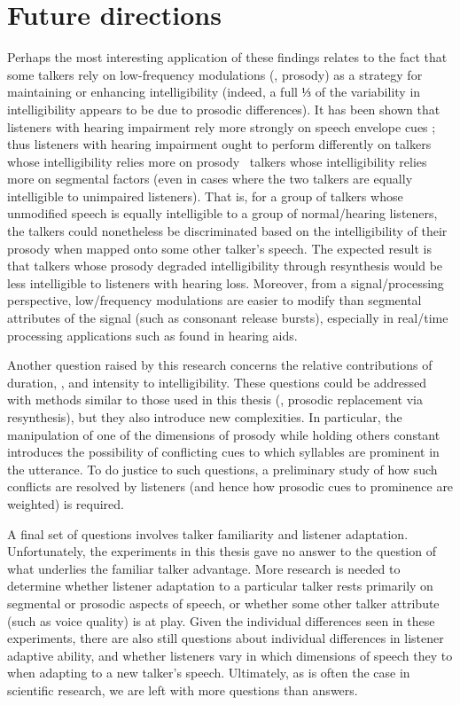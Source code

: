 \section{Future directions}
Perhaps the most interesting application of these findings relates to the fact that some talkers rely on low-frequency modulations (\ie, prosody) as a strategy for maintaining or enhancing intelligibility (indeed, a full ⅓ of the variability in intelligibility appears to be due to prosodic differences).  It has been shown that listeners with hearing impairment rely more strongly on speech envelope cues \citep{LorenziEtAl2006}; thus listeners with hearing impairment ought to perform differently on talkers whose intelligibility relies more on prosody \vs\ talkers whose intelligibility relies more on segmental factors (even in cases where the two talkers are equally intelligible to unimpaired listeners).  That is, for a group of talkers whose unmodified speech is equally intelligible to a group of normal\-/hearing listeners, the talkers could nonetheless be discriminated based on the intelligibility of their prosody when mapped onto some other talker’s speech.  The expected result is that talkers whose prosody degraded intelligibility through resynthesis would be less intelligible to listeners with hearing loss.  Moreover, from a signal\-/processing perspective, low\-/frequency modulations are easier to modify than segmental attributes of the signal (such as consonant release bursts), especially in real\-/time processing applications such as found in hearing aids.

Another question raised by this research concerns the relative contributions of duration, \fo, and intensity to intelligibility.  These questions could be addressed with methods similar to those used in this thesis (\ie, prosodic replacement via resynthesis), but they also introduce new complexities.  In particular, the manipulation of one of the dimensions of prosody while holding others constant introduces the possibility of conflicting cues to which syllables are prominent in the utterance.  To do justice to such questions, a preliminary study of how such conflicts are resolved by listeners (and hence how prosodic cues to prominence are weighted) is required.

A final set of questions involves talker familiarity and listener adaptation.  Unfortunately, the experiments in this thesis gave no answer to the question of what underlies the familiar talker advantage.  More research is needed to determine whether listener adaptation to a particular talker rests primarily on segmental or prosodic aspects of speech, or whether some other talker attribute (such as voice quality) is at play.  Given the individual differences seen in these experiments, there are also still questions about individual differences in listener adaptive ability, and whether listeners vary in which dimensions of speech they  to when adapting to a new talker’s speech.  Ultimately, as is often the case in scientific research, we are left with more questions than answers.


